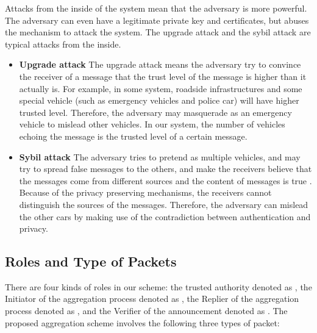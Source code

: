 \documentclass[a4paper]{article}
\begin{document}
Attacks from the inside of the system mean that the adversary is more powerful. The adversary can even have a legitimate private key and certificates, but abuses the mechanism to attack the system. The upgrade attack and the sybil attack are typical attacks from the inside.
\begin{itemize}
  \item \textbf{Upgrade attack} The upgrade attack means the adversary try to convince the receiver of a message that the trust level of the message is higher than it actually is. For example, in some system, roadside infrastructures and some special vehicle (such as emergency vehicles and police car) will have higher trusted level. Therefore, the adversary may masquerade as an emergency vehicle to mislead other vehicles. In our system, the number of vehicles echoing the message is the trusted level of a certain message.
  \item \textbf{Sybil attack} The adversary tries to pretend as multiple vehicles, and may try to spread false messages to the others, and make the receivers believe that the messages come from different sources and the content of messages is true \cite{Dou02}. Because of the privacy preserving mechanisms, the receivers cannot distinguish the sources of the messages. Therefore, the adversary can mislead the other cars by making use of the contradiction between authentication and privacy.
\end{itemize}

\subsection{Roles and Type of Packets}
There are four kinds of roles in our scheme: the trusted authority denoted as , the Initiator of the aggregation process denoted as , the Replier of the aggregation process denoted as , and the Verifier of the announcement denoted as . The proposed aggregation scheme involves the following three types of packet:
\end{document}
